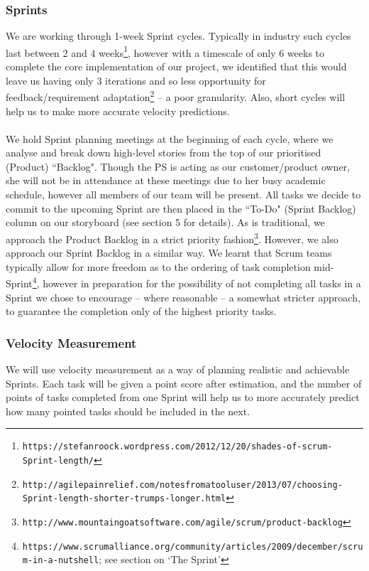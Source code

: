 \documentclass[10pt]{article}
\begin{document}
\subsubsection{Sprints}
We are working through 1-week Sprint cycles. Typically in industry such cycles last between 2 and 4 weeks\footnote{\texttt{https://stefanroock.wordpress.com/2012/12/20/shades-of-scrum-Sprint-length/}}, however with a timescale of only 6 weeks to complete the core implementation of our project, we identified that this would leave us having only 3 iterations and so less opportunity for feedback/requirement adaptation\footnote{\texttt{http://agilepainrelief.com/notesfromatooluser/2013/07/choosing-Sprint-length-shorter-trumps-longer.html}} -- a poor granularity. Also, short cycles will help us to make more accurate velocity predictions.\\\\
We hold Sprint planning meetings at the beginning of each cycle, where we analyse and break down high-level stories from the top of our prioritised (Product) ``Backlog". Though the PS is acting as our customer/product owner, she will not be in attendance at these meetings due to her busy academic schedule, however all members of our team will be present. All tasks we decide to commit to the upcoming Sprint are then placed in the ``To-Do" (Sprint Backlog) column on our storyboard (see section 5 for details). As is traditional, we approach the Product Backlog in a strict priority fashion\footnote{\texttt{http://www.mountaingoatsoftware.com/agile/scrum/product-backlog}}. However, we also approach our Sprint Backlog in a similar way. We learnt that Scrum teams typically allow for more freedom as to the ordering of task completion mid-Sprint\footnote{\texttt{https://www.scrumalliance.org/community/articles/2009/december/scrum-in-a-nutshell}; see section on `The Sprint'}, however in preparation for the possibility of not completing all tasks in a Sprint we chose to encourage -- where reasonable -- a somewhat stricter approach, to guarantee the completion only of the highest priority tasks.
\subsubsection{Velocity Measurement}
We will use velocity measurement as a way of planning realistic and achievable Sprints. Each task will be given a point score after estimation, and the number of points of tasks completed from one Sprint will help us to more accurately predict how many pointed tasks should be included in the next.
\end{document}
